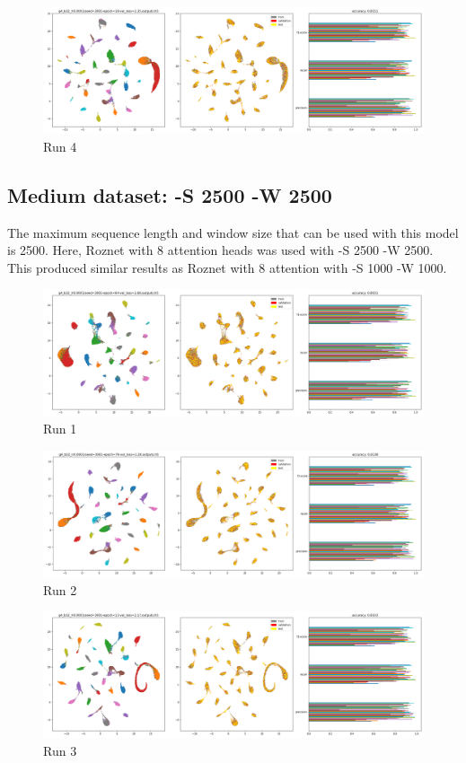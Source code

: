 \documentclass{article}
\begin{document}
\begin{figure}[h!]
  \includegraphics[width=\linewidth]{new_journal/figures/experiments/roznet_multi/16_heads/run4.png}
  \caption{Run 4}
\end{figure}

\clearpage

\subsection*{Medium dataset: -S 2500 -W 2500}
The maximum sequence length and window size that can be used with this model is 2500. Here, Roznet with 8 attention heads was used with -S 2500 -W 2500. This produced similar results as Roznet with 8 attention with -S 1000 -W 1000. 

\begin{figure}[h!]
  \includegraphics[width=\linewidth]{new_journal/figures/experiments/roznet_multi/S2500_W2500/run1.png}
  \caption{Run 1}
\end{figure}

\begin{figure}[h!]
  \includegraphics[width=\linewidth]{new_journal/figures/experiments/roznet_multi/S2500_W2500/run2.png}
  \caption{Run 2}
\end{figure}

\begin{figure}[h!]
  \includegraphics[width=\linewidth]{new_journal/figures/experiments/roznet_multi/S2500_W2500/run3.png}
  \caption{Run 3}
\end{figure}
\end{document}
